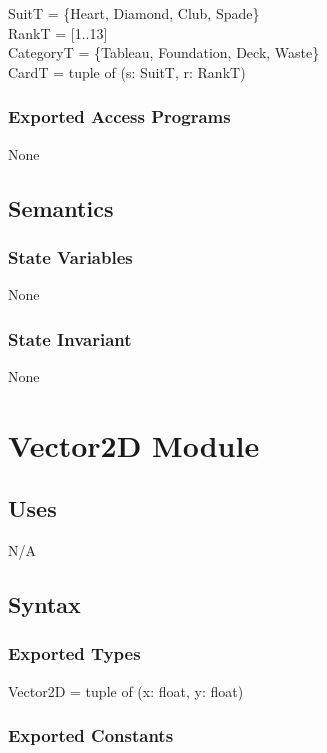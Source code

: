 \documentclass[12pt]{article}
\begin{document}
SuitT = \{Heart, Diamond, Club, Spade\}\\
RankT = [1..13]\\
CategoryT = \{Tableau, Foundation, Deck, Waste\}\\
CardT = tuple of (s: SuitT, r: RankT)

\subsubsection* {Exported Access Programs}

None

\subsection* {Semantics}

\subsubsection* {State Variables}

None

\subsubsection* {State Invariant}

None

\newpage

\section* {Vector2D Module}

\subsection* {Uses}

N/A

\subsection* {Syntax}

\subsubsection* {Exported Types}

Vector2D = tuple of (x: float, y: float)

\subsubsection* {Exported Constants}
\end{document}
